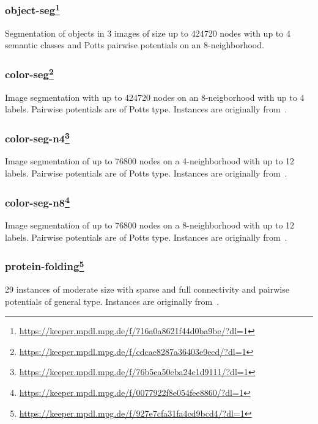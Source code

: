 \subsubsection[object-seg]{object-seg\footnote{\url{https://keeper.mpdl.mpg.de/f/716a0a8621f44d0ba9be/?dl=1}}}
Segmentation of objects in 3 images of size up to 424720 nodes with up to 4 semantic classes and Potts pairwise potentials on an 8-neighborhood.

\subsubsection[color-seg]{color-seg\footnote{\url{https://keeper.mpdl.mpg.de/f/cdcae8287a36403e9ecd/?dl=1}}}
Image segmentation with up to 424720 nodes on an 8-neigborhood with up to 4 labels. 
Pairwise potentials are of Potts type.
Instances are originally from~\cite{alahari2009dynamic}.

\subsubsection[color-seg-n4]{color-seg-n4\footnote{\url{https://keeper.mpdl.mpg.de/f/76b5ea50eba24c1d9111/?dl=1}}}
Image segmentation of up to 76800 nodes on a 4-neighborhood with up to 12 labels. 
Pairwise potentials are of Potts type.
Instances are originally from~\cite{lellmann2011continuous}.

\subsubsection[color-seg-n8]{color-seg-n8\footnote{\url{https://keeper.mpdl.mpg.de/f/0077922f8e054fee8860/?dl=1}}}
Image segmentation of up to 76800 nodes on a 8-neighborhood with up to 12 labels. 
Pairwise potentials are of Potts type.
Instances are originally from~\cite{lellmann2011continuous}.

\subsubsection[protein-folding]{protein-folding\footnote{\url{https://keeper.mpdl.mpg.de/f/927e7cfa31fa4cd9bcd4/?dl=1}}}
29 instances of moderate size with sparse and full connectivity and pairwise potentials of general type.
Instances are originally from~\cite{jaimovich2006towards,elidan2011probabilistic}.


